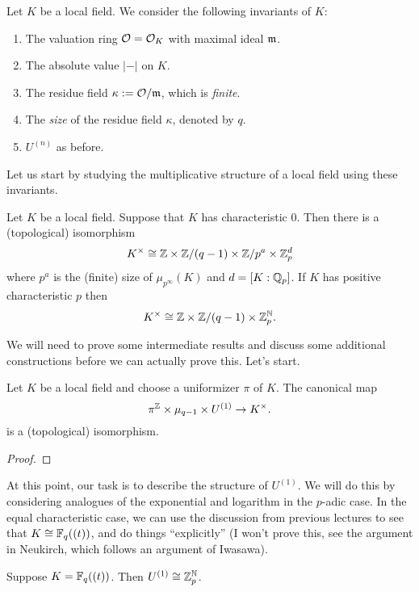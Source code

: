 Let $K$ be a local field.
We consider the following invariants of $K$:
\begin{enumerate}
  \item The valuation ring $\mathcal{O} = \mathcal{O}_{K}$ with maximal ideal $\mathfrak{m}$.
  \item The absolute value $|-|$ on $K$.
  \item The residue field $\kappa := \mathcal{O}/\mathfrak{m}$, which is \emph{finite}.
  \item The \emph{size} of the residue field $\kappa$, denoted by $q$.
  \item $U^{(n)}$ as before.
\end{enumerate}

Let us start by studying the multiplicative structure of a local field using these invariants.
\begin{theorem}
  Let $K$ be a local field.
  Suppose that $K$ has characteristic $0$.
  Then there is a (topological) isomorphism
  \[ K^{\times} \cong \mathbb{Z} \times \mathbb{Z}/(q-1) \times \mathbb{Z}/p^{a} \times \mathbb{Z}_{p}^{d} \]
  where $p^{a}$ is the (finite) size of $\mu_{p^{\infty}}(K)$ and $d = [K:\mathbb{Q}_{p}]$.
  If $K$ has positive characteristic $p$ then
  \[ K^{\times} \cong \mathbb{Z} \times \mathbb{Z}/(q-1) \times \mathbb{Z}_{p}^{\mathbb{N}}. \]
\end{theorem}

We will need to prove some intermediate results and discuss some additional constructions before we can actually prove this.
Let's start.

\begin{proposition}
  Let $K$ be a local field and choose a uniformizer $\pi$ of $K$.
  The canonical map
  \[ \pi^{\mathbb{Z}} \times \mu_{q-1} \times U^{(1)} \to K^{\times}. \]
  is a (topological) isomorphism.
\end{proposition}
\begin{proof}
\end{proof}

At this point, our task is to describe the structure of $U^{(1)}$.
We will do this by considering analogues of the exponential and logarithm in the $p$-adic case.
In the equal characteristic case, we can use the discussion from previous lectures to see that $K \cong \mathbb{F}_{q}((t))$, and do things ``explicitly'' (I won't prove this, see the argument in Neukirch, which follows an argument of Iwasawa).

\begin{proposition}
  Suppose $K = \mathbb{F}_{q}((t))$.
  Then $U^{(1)} \cong \mathbb{Z}_{p}^{\mathbb{N}}$.
\end{proposition}

